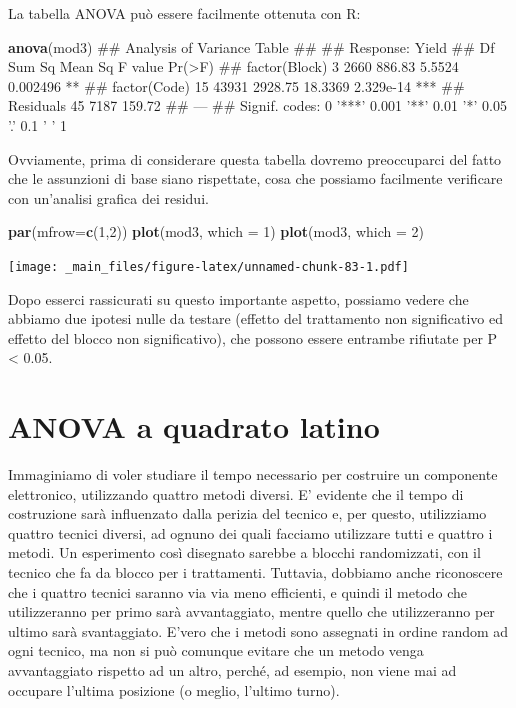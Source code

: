 \documentclass[a4paper,12pt,oneside]{book}
\newenvironment{Shaded}{\begin{snugshade}}{\end{snugshade}}
\newcommand{\KeywordTok}[1]{\textcolor[rgb]{0.13,0.29,0.53}{\textbf{#1}}}
\newcommand{\DataTypeTok}[1]{\textcolor[rgb]{0.13,0.29,0.53}{#1}}
\newcommand{\DecValTok}[1]{\textcolor[rgb]{0.00,0.00,0.81}{#1}}
\newcommand{\NormalTok}[1]{#1}
\theoremstyle{definition}
\theoremstyle{definition}
\theoremstyle{definition}
\theoremstyle{remark}
\begin{document}
La tabella ANOVA può essere facilmente ottenuta con R:

\begin{Shaded}
\begin{Highlighting}[]
\KeywordTok{anova}\NormalTok{(mod3)}
\NormalTok{## Analysis of Variance Table}
\NormalTok{## }
\NormalTok{## Response: Yield}
\NormalTok{##               Df Sum Sq Mean Sq F value    Pr(>F)    }
\NormalTok{## factor(Block)  3   2660  886.83  5.5524  0.002496 ** }
\NormalTok{## factor(Code)  15  43931 2928.75 18.3369 2.329e-14 ***}
\NormalTok{## Residuals     45   7187  159.72                      }
\NormalTok{## ---}
\NormalTok{## Signif. codes:  0 '***' 0.001 '**' 0.01 '*' 0.05 '.' 0.1 ' ' 1}
\end{Highlighting}
\end{Shaded}

Ovviamente, prima di considerare questa tabella dovremo preoccuparci del
fatto che le assunzioni di base siano rispettate, cosa che possiamo
facilmente verificare con un'analisi grafica dei residui.

\begin{Shaded}
\begin{Highlighting}[]
\KeywordTok{par}\NormalTok{(}\DataTypeTok{mfrow=}\KeywordTok{c}\NormalTok{(}\DecValTok{1}\NormalTok{,}\DecValTok{2}\NormalTok{))}
\KeywordTok{plot}\NormalTok{(mod3, }\DataTypeTok{which =} \DecValTok{1}\NormalTok{)}
\KeywordTok{plot}\NormalTok{(mod3, }\DataTypeTok{which =} \DecValTok{2}\NormalTok{)}
\end{Highlighting}
\end{Shaded}

\texttt{[image: \_main\_files/figure-latex/unnamed-chunk-83-1.pdf]}

Dopo esserci rassicurati su questo importante aspetto, possiamo vedere
che abbiamo due ipotesi nulle da testare (effetto del trattamento non
significativo ed effetto del blocco non significativo), che possono
essere entrambe rifiutate per P \textless{} 0.05.

\section{ANOVA a quadrato latino}\label{anova-a-quadrato-latino}

Immaginiamo di voler studiare il tempo necessario per costruire un
componente elettronico, utilizzando quattro metodi diversi. E' evidente
che il tempo di costruzione sarà influenzato dalla perizia del tecnico
e, per questo, utilizziamo quattro tecnici diversi, ad ognuno dei quali
facciamo utilizzare tutti e quattro i metodi. Un esperimento così
disegnato sarebbe a blocchi randomizzati, con il tecnico che fa da
blocco per i trattamenti. Tuttavia, dobbiamo anche riconoscere che i
quattro tecnici saranno via via meno efficienti, e quindi il metodo che
utilizzeranno per primo sarà avvantaggiato, mentre quello che
utilizzeranno per ultimo sarà svantaggiato. E'vero che i metodi sono
assegnati in ordine random ad ogni tecnico, ma non si può comunque
evitare che un metodo venga avvantaggiato rispetto ad un altro, perché,
ad esempio, non viene mai ad occupare l'ultima posizione (o meglio,
l'ultimo turno).
\end{document}
